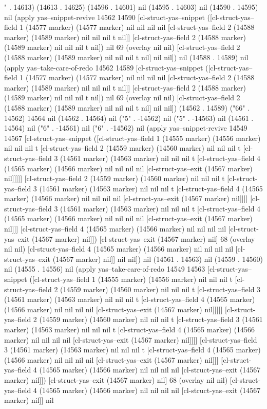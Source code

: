 " . 14613) (14613 . 14625) (14596 . 14601) nil (14595 . 14603) nil (14590 . 14595) nil (apply yas--snippet-revive 14562 14590 [cl-struct-yas--snippet ([cl-struct-yas--field 1 (14577 marker) (14577 marker) nil nil nil nil [cl-struct-yas--field 2 (14588 marker) (14589 marker) nil nil nil t nil]] [cl-struct-yas--field 2 (14588 marker) (14589 marker) nil nil nil t nil]) nil 69 (overlay nil nil) [cl-struct-yas--field 2 (14588 marker) (14589 marker) nil nil nil t nil] nil nil]) nil (14588 . 14589) nil (apply yas--take-care-of-redo 14562 14589 [cl-struct-yas--snippet ([cl-struct-yas--field 1 (14577 marker) (14577 marker) nil nil nil nil [cl-struct-yas--field 2 (14588 marker) (14589 marker) nil nil nil t nil]] [cl-struct-yas--field 2 (14588 marker) (14589 marker) nil nil nil t nil]) nil 69 (overlay nil nil) [cl-struct-yas--field 2 (14588 marker) (14589 marker) nil nil nil t nil] nil nil]) (14562 . 14589) ("66" . 14562) 14564 nil (14562 . 14564) nil ("5" . -14562) nil ("5" . -14563) nil (14561 . 14564) nil ("6" . -14561) nil ("6" . -14562) nil (apply yas--snippet-revive 14549 14567 [cl-struct-yas--snippet ([cl-struct-yas--field 1 (14555 marker) (14556 marker) nil nil nil t [cl-struct-yas--field 2 (14559 marker) (14560 marker) nil nil nil t [cl-struct-yas--field 3 (14561 marker) (14563 marker) nil nil nil t [cl-struct-yas--field 4 (14565 marker) (14566 marker) nil nil nil nil [cl-struct-yas--exit (14567 marker) nil]]]]] [cl-struct-yas--field 2 (14559 marker) (14560 marker) nil nil nil t [cl-struct-yas--field 3 (14561 marker) (14563 marker) nil nil nil t [cl-struct-yas--field 4 (14565 marker) (14566 marker) nil nil nil nil [cl-struct-yas--exit (14567 marker) nil]]]] [cl-struct-yas--field 3 (14561 marker) (14563 marker) nil nil nil t [cl-struct-yas--field 4 (14565 marker) (14566 marker) nil nil nil nil [cl-struct-yas--exit (14567 marker) nil]]] [cl-struct-yas--field 4 (14565 marker) (14566 marker) nil nil nil nil [cl-struct-yas--exit (14567 marker) nil]]) [cl-struct-yas--exit (14567 marker) nil] 68 (overlay nil nil) [cl-struct-yas--field 4 (14565 marker) (14566 marker) nil nil nil nil [cl-struct-yas--exit (14567 marker) nil]] nil nil]) nil (14561 . 14563) nil (14559 . 14560) nil (14555 . 14556) nil (apply yas--take-care-of-redo 14549 14563 [cl-struct-yas--snippet ([cl-struct-yas--field 1 (14555 marker) (14556 marker) nil nil nil t [cl-struct-yas--field 2 (14559 marker) (14560 marker) nil nil nil t [cl-struct-yas--field 3 (14561 marker) (14563 marker) nil nil nil t [cl-struct-yas--field 4 (14565 marker) (14566 marker) nil nil nil nil [cl-struct-yas--exit (14567 marker) nil]]]]] [cl-struct-yas--field 2 (14559 marker) (14560 marker) nil nil nil t [cl-struct-yas--field 3 (14561 marker) (14563 marker) nil nil nil t [cl-struct-yas--field 4 (14565 marker) (14566 marker) nil nil nil nil [cl-struct-yas--exit (14567 marker) nil]]]] [cl-struct-yas--field 3 (14561 marker) (14563 marker) nil nil nil t [cl-struct-yas--field 4 (14565 marker) (14566 marker) nil nil nil nil [cl-struct-yas--exit (14567 marker) nil]]] [cl-struct-yas--field 4 (14565 marker) (14566 marker) nil nil nil nil [cl-struct-yas--exit (14567 marker) nil]]) [cl-struct-yas--exit (14567 marker) nil] 68 (overlay nil nil) [cl-struct-yas--field 4 (14565 marker) (14566 marker) nil nil nil nil [cl-struct-yas--exit (14567 marker) nil]] nil 